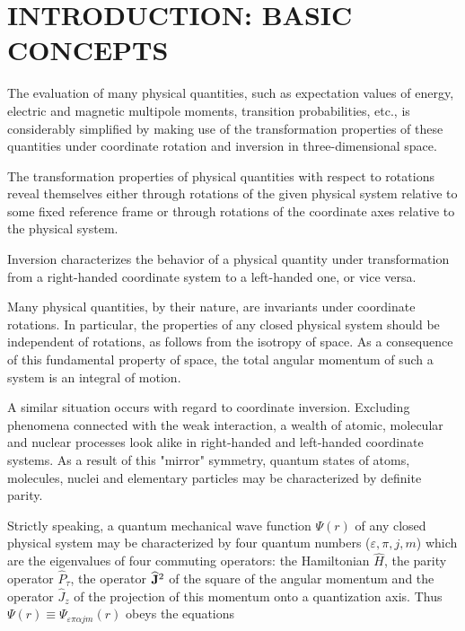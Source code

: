 \chapter*{INTRODUCTION: BASIC CONCEPTS}
The evaluation of many physical quantities, such as expectation values of energy, electric and magnetic multipole moments, transition probabilities, etc., is considerably simplified by making use of the transformation properties of these quantities under coordinate rotation and inversion in three-dimensional space.

The transformation properties of physical quantities with respect to rotations reveal themselves either through rotations of the given physical system relative to some fixed reference frame or through rotations of the coordinate axes relative to the physical system.

Inversion characterizes the behavior of a physical quantity under transformation from a right-handed coordinate system to a left-handed one, or vice versa.

Many physical quantities, by their nature, are invariants under coordinate rotations. In particular, the properties of any closed physical system should be independent of rotations, as follows from the isotropy of space. As a consequence of this fundamental property of space, the total angular momentum of such a system is an integral of motion.

A similar situation occurs with regard to coordinate inversion. Excluding phenomena connected with the weak interaction, a wealth of atomic, molecular and nuclear processes look alike in right-handed and left-handed coordinate systems. As a result of this "mirror" symmetry, quantum states of atoms, molecules, nuclei and elementary particles may be characterized by definite parity.

Strictly speaking, a quantum mechanical wave function $\Psi(r)$ of any closed physical system may be characterized by four quantum numbers ($\varepsilon, \pi, j, m$) which are the eigenvalues of four commuting operators: the Hamiltonian $\widehat{H}$, the parity operator $\widehat{P}_{\tau}$, the operator $\widehat{\mathbf{J}}^{2}$ of the square of the angular momentum and the operator $\widehat{J}_{z}$ of the projection of this momentum onto a quantization axis. Thus $\Psi(r) \equiv \Psi_{\varepsilon \pi \alpha j m}(r)$ obeys the equations

